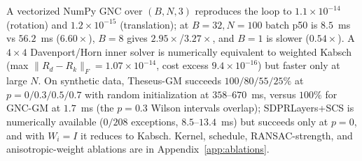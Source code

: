 A vectorized NumPy GNC over $(B,N,3)$ reproduces the loop to $1.1\times10^{-14}$ (rotation) and
$1.2\times10^{-15}$ (translation); at $B=32,N=100$ batch p50 is $8.5$~ms vs $56.2$~ms
($6.60\times$), $B=8$ gives $2.95\times$/$3.27\times$, and $B=1$ is slower ($0.54\times$). A
$4\times4$ Davenport/Horn inner solver \cite{horn1987} is numerically equivalent to weighted Kabsch
(max $\|R_d-R_k\|_F=1.07\times10^{-14}$, cost excess $9.4\times10^{-16}$) but faster only at large
$N$. On synthetic data, Theseus-GM succeeds $100/80/55/25\%$ at $p=0/0.3/0.5/0.7$ with random
initialization at $358$--$670$~ms, versus $100\%$ for GNC-GM at $1.7$~ms (the $p=0.3$ Wilson
intervals overlap); SDPRLayers+SCS is numerically available ($0/208$ exceptions, $8.5$--$13.4$~ms)
but succeeds only at $p=0$, and with $W_i=I$ it reduces to Kabsch. Kernel, schedule,
RANSAC-strength, and anisotropic-weight ablations are in Appendix~\ref{app:ablations}.
